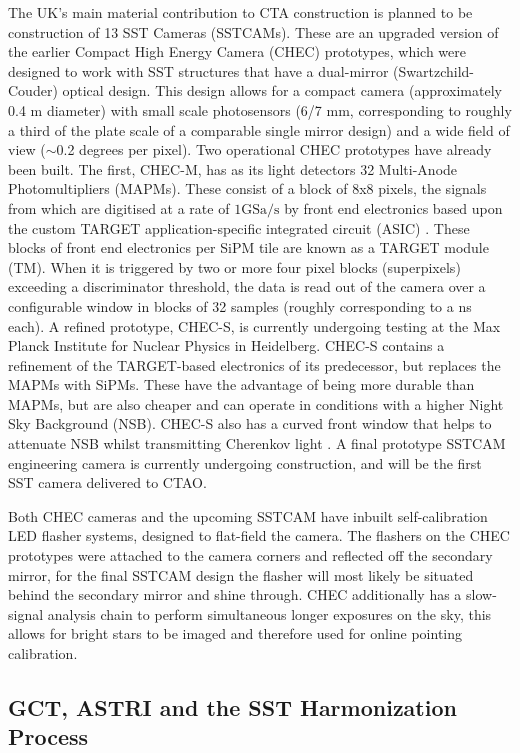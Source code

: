 The UK's main material contribution to CTA construction is planned to be construction of 13 SST Cameras (SSTCAMs). These are an upgraded version of the earlier Compact High Energy Camera (CHEC) prototypes, which were designed to work with SST structures that have a dual-mirror (Swartzchild-Couder) optical design. This design allows for a compact camera (approximately 0.4 m diameter) with small scale photosensors (6/7 mm, corresponding to roughly a third of the plate scale of a comparable single mirror design) and a wide field of view ($\sim$0.2 degrees per pixel).  Two operational CHEC prototypes have already been built. The first, CHEC-M, has as its light detectors 32 Multi-Anode Photomultipliers (MAPMs)\cite{tomthesis}. These consist of a block of 8x8 pixels, the signals from which are digitised at a rate of $1\mathrm{GSa}/\mathrm{s}$ \cite{tomthesis} by front end electronics based upon the custom TARGET application-specific integrated circuit (ASIC) \cite{checmpaper}. These blocks of front end electronics per SiPM tile are known as  a TARGET module (TM). When it is triggered by two or more four pixel blocks (superpixels) exceeding a discriminator threshold, the data is read out of the camera over a configurable window in blocks of 32 samples (roughly corresponding to a ns each). A refined prototype, CHEC-S, is currently undergoing testing at the Max Planck Institute for Nuclear Physics in Heidelberg. CHEC-S contains a refinement of the TARGET-based electronics of its predecessor, but replaces the MAPMs with SiPMs. These have the advantage of being more durable than MAPMs, but are also cheaper and can operate in conditions with a higher Night Sky Background (NSB). CHEC-S also has a curved front window that helps to attenuate NSB whilst transmitting Cherenkov light \cite{ssticrc}. A final prototype SSTCAM engineering camera is currently undergoing construction, and will be the first SST camera delivered to CTAO.

Both CHEC cameras and the upcoming SSTCAM have inbuilt self-calibration LED flasher systems, designed to flat-field the camera. The flashers on the CHEC prototypes were attached to the camera corners and reflected off the secondary mirror, for the final SSTCAM design the flasher will most likely be situated behind the secondary mirror and shine through. CHEC additionally has a slow-signal analysis chain to perform simultaneous longer exposures on the sky, this allows for bright stars to be imaged and therefore used for online pointing calibration.

\subsection{GCT, ASTRI and the SST Harmonization Process}

